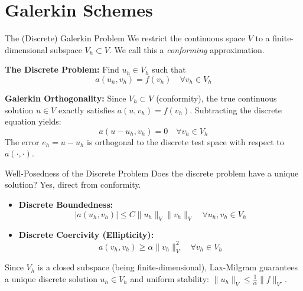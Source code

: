 \documentclass[aspectratio=169]{beamer}
\begin{document}
\section{Galerkin Schemes}

\begin{frame}{The (Discrete) Galerkin Problem}
    We restrict the continuous space $V$ to a finite-dimensional subspace $V_h \subset V$. We call this a \emph{conforming} approximation.

    \vspace{0.2cm}
    \textbf{The Discrete Problem:} Find $u_h \in V_h$ such that
    $$ a(u_h, v_h) = f(v_h) \quad \forall v_h \in V_h $$

    \vspace{0.2cm}
    \textbf{Galerkin Orthogonality:}
    Since $V_h \subset V$ (conformity), the true continuous solution $u \in V$ exactly satisfies $a(u, v_h) = f(v_h)$. Subtracting the discrete equation yields:
    $$ a(u - u_h, v_h) = 0 \quad \forall v_h \in V_h $$
    The error $e_h = u - u_h$ is orthogonal to the discrete test space with respect to $a(\cdot, \cdot)$.
\end{frame}

\begin{frame}{Well-Posedness of the Discrete Problem}
    Does the discrete problem have a unique solution? Yes, direct from conformity.

    \vspace{0.2cm}
    \begin{itemize}
        \item \textbf{Discrete Boundedness:}
        $$ |a(u_h, v_h)| \le C \|u_h\|_V \|v_h\|_V \quad \forall u_h, v_h \in V_h $$
        \item \textbf{Discrete Coercivity (Ellipticity):}
        $$ a(v_h, v_h) \ge \alpha \|v_h\|^2_V \quad \forall v_h \in V_h $$
    \end{itemize}

    \vspace{0.2cm}
    Since $V_h$ is a closed subspace (being finite-dimensional), Lax-Milgram guarantees a unique discrete solution $u_h \in V_h$ and uniform stability: $\|u_h\|_V \le \frac{1}{\alpha}\|f\|_{V'}$.
\end{frame}
\end{document}
